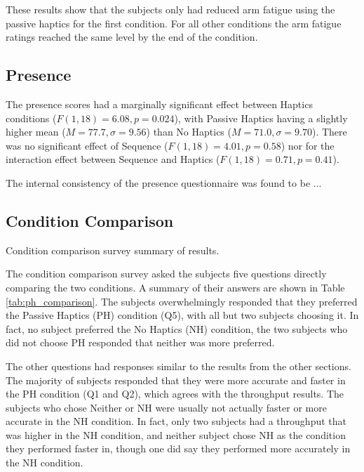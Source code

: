 These results show that the subjects only had reduced arm fatigue using the passive haptics for the first condition.
For all other conditions the arm fatigue ratings reached the same level by the end of the condition.

\subsection{Presence}

The presence scores had a marginally significant effect between Haptics conditions ($F(1,18)=6.08, p=0.024$), with Passive Haptics having a slightly higher mean ($M=77.7, \sigma=9.56$) than No Haptics ($M=71.0, \sigma=9.70$).
There was no significant effect of Sequence ($F(1,18)=4.01, p=0.58$) nor for the interaction effect between Sequence and Haptics ($F(1,18)=0.71, p=0.41$).

The internal consistency of the presence questionnaire was found to be ...

\subsection{Condition Comparison}

\begin{table}
    \centering
    \caption{Condition comparison survey summary of results.}
    \label{tab:ph_comparison}
\end{table}

The condition comparison survey asked the subjects five questions directly comparing the two conditions.
A summary of their answers are shown in Table \ref{tab:ph_comparison}.
The subjects overwhelmingly responded that they preferred the Passive Haptics (PH) condition (Q5), with all but two subjects choosing it.
In fact, no subject preferred the No Haptics (NH) condition, the two subjects who did not choose PH responded that neither was more preferred.

The other questions had responses similar to the results from the other sections.
The majority of subjects responded that they were more accurate and faster in the PH condition (Q1 and Q2), which agrees with the throughput results.
The subjects who chose Neither or NH were usually not actually faster or more accurate in the NH condition.
In fact, only two subjects had a throughput that was higher in the NH condition, and neither subject chose NH as the condition they performed faster in, though one did say they performed more accurately in the NH condition.

